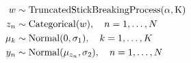 \begin{equation}
  \label{eq:imm}
  \begin{aligned}
    w &\sim \mathrm{TruncatedStickBreakingProcess(\alpha, K)} \\
    z_{n} &\sim \mathrm{Categorical}(w), \quad n = 1, \ldots, N \\
    \mu_{k} &\sim \mathrm{Normal}(0, \sigma_{1}), \quad k = 1, \ldots, K \\
    y_{n} &\sim \mathrm{Normal}(\mu_{z_{n}}, \sigma_{2}), \quad n = 1, \ldots, N
  \end{aligned}
\end{equation}







